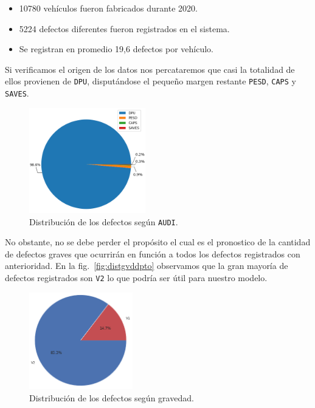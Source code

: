 \documentclass[a4paper,12pt]{article}
\begin{document}
		\begin{itemize}[noitemsep, topsep=2pt]
			\item 10780 vehículos fueron fabricados durante 2020.
			\item 5224 defectos diferentes fueron registrados en el sistema.
			\item Se registran en promedio 19,6 defectos por vehículo.
		\end{itemize}
				
		Si verificamos el origen de los datos nos percataremos que casi la totalidad de ellos provienen de \texttt{DPU}, disputándose el pequeño margen restante \texttt{PESD}, \texttt{CAPS} y \texttt{SAVES}.
				
		\begin{figure}[H]
			\begin{center}				
				\includegraphics[width=0.45\textwidth]{audidist.png}
				\caption{Distribución de los defectos según \texttt{AUDI}.}
				\label{fig:distaudi}
			\end{center}
		\end{figure}
				
		No obstante, no se debe perder el propósito el cual es el pronostico de la cantidad de defectos graves que ocurrirán en función a todos los defectos registrados con anterioridad. En la fig.~\ref{fig:distgvddpto} observamos que la gran mayoría de defectos registrados son \texttt{V2} lo que podría ser útil para nuestro modelo.
				
		\begin{figure}[H]
			\begin{center}				
				\includegraphics[width=0.40\textwidth]{tesis_51.png}
				\caption{Distribución de los defectos según gravedad.}
				\label{fig:distgvd}
			\end{center}
		\end{figure}
				
\end{document}
